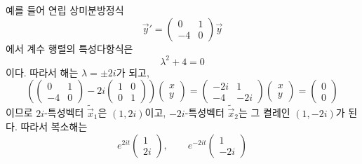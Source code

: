 \documentclass[../engineering_mathematics_lecture_note.tex]{subfiles}
\begin{document}
\begin{enumerate}
        예를 들어 연립 상미분방정식
        \begin{equation*}
            \vec y' = \begin{pmatrix}
                0 & 1\\
                -4 & 0
            \end{pmatrix}
            \vec y
        \end{equation*}
        에서 계수 행렬의 특성다항식은
        \begin{equation*}
            \lambda^2 + 4 = 0
        \end{equation*}
        이다.
        따라서 해는 $\lambda = \pm 2i$가 되고,
        \begin{equation*}
            \left( \begin{pmatrix}
                0 & 1\\
                -4 & 0
            \end{pmatrix}
            - 2i \begin{pmatrix}
                1 & 0\\
                0 & 1
            \end{pmatrix} \right) \begin{pmatrix}
                x \\ y
            \end{pmatrix}
            = \begin{pmatrix}
                -2i & 1\\
                -4 & -2i
            \end{pmatrix}
            \begin{pmatrix}
                x \\ y
            \end{pmatrix}
            = \begin{pmatrix}
                0 \\ 0
            \end{pmatrix}
        \end{equation*}
        이므로 $2i$-특성벡터 $\tilde{\vec x}_1$은 $(1, 2i)$이고, $-2i$-특성벡터 $\tilde{\vec x}_2$는 그 켤레인 $(1, -2i)$가 된다.
        따라서 복소해는
        \begin{equation*}
            e^{2it} \begin{pmatrix}
                1 \\ 2i
                \end{pmatrix}, \qquad e^{-2it} \begin{pmatrix}
                1 \\ -2i

\end{pmatrix}
\end{equation*}
\end{enumerate}
\end{document}

